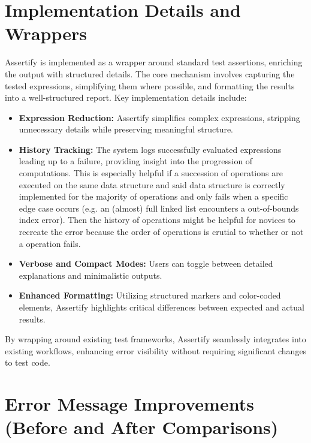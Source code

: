 \section{Implementation Details and Wrappers} %



Assertify is implemented as a wrapper around standard test assertions, enriching the output with structured details. The core mechanism involves capturing the tested expressions, simplifying them where possible, and formatting the results into a well-structured report.
Key implementation details include:
\begin{itemize}
    \item \textbf{Expression Reduction:} Assertify simplifies complex expressions, stripping unnecessary details while preserving meaningful structure.
    \item \textbf{History Tracking:} The system logs successfully evaluated expressions leading up to a failure, providing insight into the progression of computations.
        This is especially helpful if a succession of operations are executed on the same data structure and said data structure is correctly implemented for the majority of operations
        and only fails when a specific edge case occurs (e.g. an (almost) full linked list encounters a out-of-bounds index error).
        Then the history of operations might be helpful for novices to recreate the error because the order of operations is crutial to whether or not a operation fails.
    \item \textbf{Verbose and Compact Modes:} Users can toggle between detailed explanations and minimalistic outputs.
    \item \textbf{Enhanced Formatting:} Utilizing structured markers and color-coded elements, Assertify highlights critical differences between expected and actual results.
\end{itemize}
By wrapping around existing test frameworks, Assertify seamlessly integrates into existing workflows, enhancing error visibility without requiring significant changes to test code.


\section{Error Message Improvements (Before and After Comparisons)} %


